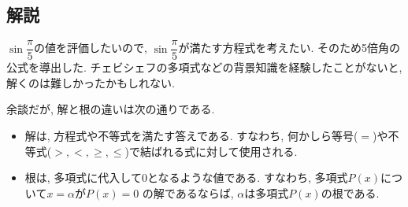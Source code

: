\documentclass[dvipdfmx,a4paper]{jsarticle}
\newcommand{\2}{I\hspace{-1pt}I}
\newcommand{\3}{I\hspace{-1pt}I\hspace{-1pt}I}
\begin{document}
    \subsection{解説}
    $\sin \dfrac{\pi}{5}$の値を評価したいので, $\sin \dfrac{\pi}{5}$が満たす方程式を考えたい. 
    そのため5倍角の公式を導出した. チェビシェフの多項式などの背景知識を経験したことがないと, 解くのは難しかったかもしれない. 

    余談だが, 解と根の違いは次の通りである. 
    \begin{itemize}
        \item 解は, 方程式や不等式を満たす答えである. すなわち, 何かしら等号($=$)や不等式($>,<,\geq, \leq$)で結ばれる式に対して使用される. 
        \item 根は, 多項式に代入して0となるような値である. すなわち, 多項式$P(x)$について$x=\alpha$が$P(x)=0$
        の解であるならば, $\alpha$は多項式$P(x)$の根である. 

    \end{itemize}
\end{document}
